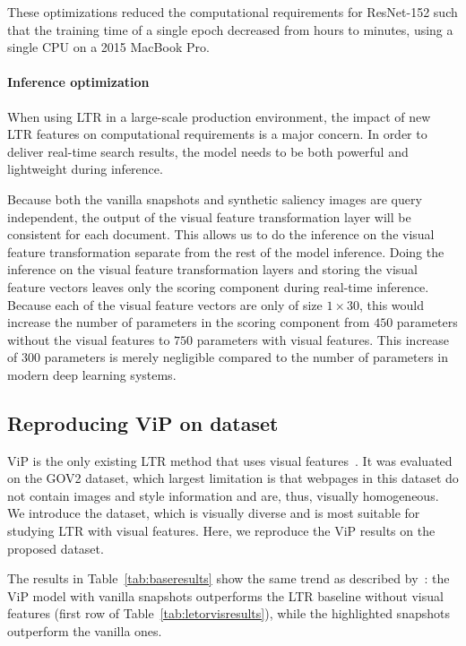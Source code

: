 These optimizations reduced the computational requirements for ResNet-152 such that the training time of a single epoch decreased from hours to minutes, using a single CPU on a 2015 MacBook Pro. 

\paragraph{Inference optimization}
When using \ac{LTR} in a large-scale production environment, the impact of new \ac{LTR} features on computational requirements is a major concern. 
In order to deliver real-time search results, the model needs to be both powerful and lightweight during inference. 

Because both the vanilla snapshots and synthetic saliency images are query independent, the output of the visual feature transformation layer will be consistent for each document. This allows us to do the inference on the visual feature transformation separate from the rest of the model inference. Doing the inference on the visual feature transformation layers and storing the visual feature vectors leaves only the scoring component during real-time inference. Because each of the visual feature vectors are only of size $1\times30$, this would increase the number of parameters in the scoring component from $450$ parameters without the visual features to $750$ parameters with visual features. This increase of $300$ parameters is merely negligible compared to the number of parameters in modern deep learning systems. 


\subsection{Reproducing ViP on \datasetname{} dataset}
ViP is the only existing \ac{LTR} method that uses visual features~\cite{fan2017learning}.
It was evaluated on the GOV2 dataset, which largest limitation is that webpages in this dataset do not contain images and style information and are, thus, visually homogeneous.
We introduce the \datasetname{} dataset, which is visually diverse and is most suitable for studying \ac{LTR} with visual features.
Here, we reproduce the ViP results on the proposed \datasetname{} dataset.

The results in Table~\ref{tab:baseresults} show the same trend as described by~\citet{fan2017learning}:
the ViP model with vanilla snapshots outperforms the \ac{LTR} baseline without visual features (first row of Table~\ref{tab:letorvisresults}),
while the highlighted snapshots outperform the vanilla ones.

